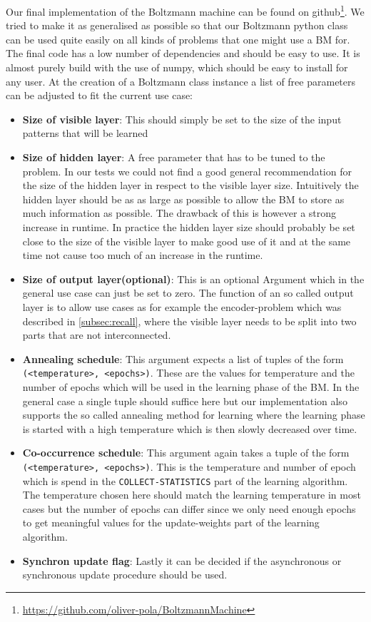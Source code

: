 \documentclass[12pt,twoside]{article}
\theoremstyle{plain}
\theoremstyle{definition}
\theoremstyle{remark}
\begin{document}
Our final implementation of the Boltzmann machine can be found on github\footnote{\url{https://github.com/oliver-pola/BoltzmannMachine}}. We tried to make it as generalised as possible
so that our Boltzmann python class can be used quite easily on all kinds of problems that one might use a BM for. The final code has a low number of dependencies and should be
easy to use. It is almost purely build with the use of numpy, which should be easy to install for any user.
At the creation of a Boltzmann class instance a list of free parameters can be adjusted to fit the current use case:
\begin{itemize}
    \item \textbf{Size of visible layer}: This should simply be set to the size of the input patterns that will be learned
    \item \textbf{Size of hidden layer}: A free parameter that
        has to be tuned to the problem. In our tests we could
        not find a good general recommendation for the size
        of the hidden layer in respect to the visible layer size.
        Intuitively the hidden layer should be as as large as possible to allow 
        the BM to store as much information as possible. The drawback of this is however
        a strong increase in runtime. In practice the hidden layer size should 
        probably be set close to the size of the visible layer to make good use of it and
        at the same time not cause too much of an increase in the runtime.

    \item \textbf{Size of output layer(optional)}: This is an optional
        Argument which in the general use case can just be set to zero.
        The function of an so called output layer is to allow use cases as
        for example the encoder-problem which was described in \cref{subsec:recall}, where
        the visible layer needs to be split into two parts that are not interconnected.
    \item \textbf{Annealing schedule}: This argument expects a list of tuples of the form
        \lstinline{(<temperature>, <epochs>)}. These are the values for temperature and the
        number of epochs which will be used in the learning phase of the BM.
        In the general case a single tuple should suffice here but our implementation also
        supports the so called annealing method for learning where the learning phase
        is started with a high temperature which is then slowly decreased over time.
    \item \textbf{Co-occurrence schedule}: This argument again takes a tuple of the form
        \lstinline{(<temperature>, <epochs>)}. This is the temperature and number of
        epoch which is spend in the \lstinline{COLLECT-STATISTICS} part of the
        learning algorithm. The temperature chosen here should match the learning
        temperature in most cases but the number of epochs can differ since we
        only need enough epochs to get meaningful values for the update-weights
        part of the learning algorithm.
    \item \textbf{Synchron update flag}: Lastly it can be decided if the asynchronous or
        synchronous update procedure should be used.
\end{itemize}
\end{document}
